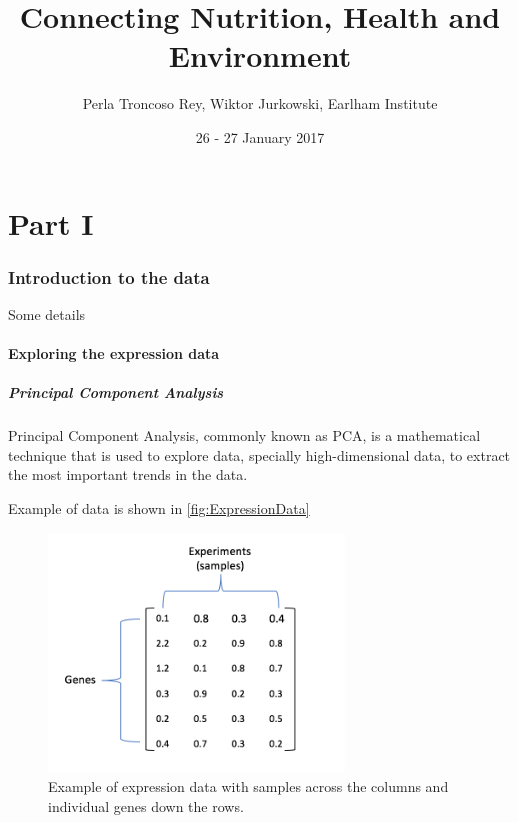 \documentclass[11pt, oneside]{article}   	%
\title{Connecting Nutrition, Health and Environment }
\author{Perla Troncoso Rey, Wiktor Jurkowski, Earlham Institute}
\date{26 - 27 January 2017}	 %
\begin{document}
\maketitle

\tableofcontents

\listoffigures
\listoftables


\part{Part I}

\section{Introduction to the data}

Some details

\subsection{Exploring the expression data}



\subsubsection{Principal Component Analysis}

Principal Component Analysis, commonly known as PCA, is a mathematical technique that is used to explore data, specially high-dimensional data, to extract the most important trends in the data.

Example of data is shown in \autoref{fig:ExpressionData}

\begin{figure}[!h]
	\centering
	\includegraphics[width=0.7\textwidth]{example_expression_data}
	\caption{Example of expression data with samples across the columns and individual genes down the rows.}
	\label{fig:ExpressionData}
\end{figure}
\end{document}
